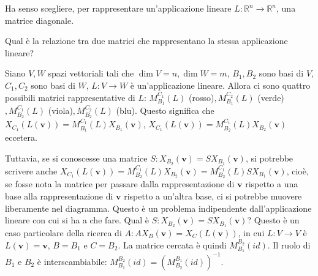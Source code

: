 \documentclass{article}
\begin{document}
Ha senso scegliere, per rappresentare un'applicazione lineare $L:%
\mathbb{R}
^{n}\rightarrow 
\mathbb{R}
^{n}$, una matrice diagonale.

Qual \`{e} la relazione tra due matrici che rappresentano la stessa
applicazione lineare?

Siano $V,W$ spazi vettoriali tali che $\dim V=n,\dim W=m$, $B_{1},B_{2}$
sono basi di $V$, $C_{1},C_{2}$ sono basi di $W$, $L:V\rightarrow W$ \`{e}
un'applicazione lineare. Allora ci sono quattro possibili matrici
rappresentative di $L$: $M_{B_{1}}^{C_{1}}\left( L\right) $ (rosso)$%
,M_{B_{1}}^{C_{2}}\left( L\right) $ (verde)$,M_{B_{2}}^{C_{1}}\left(
L\right) $ (viola)$,M_{B_{2}}^{C_{2}}\left( L\right) $ (blu). Questo
significa che $X_{C_{1}}\left( L\left( \mathbf{v}\right) \right)
=M_{B_{1}}^{C_{1}}\left( L\right) X_{B_{1}}\left( \mathbf{v}\right) $, $%
X_{C_{1}}\left( L\left( \mathbf{v}\right) \right) =M_{B_{2}}^{C_{1}}\left(
L\right) X_{B_{2}}\left( \mathbf{v}\right) $ eccetera.

Tuttavia, se si conoscesse una matrice $S:X_{B_{2}}\left( \mathbf{v}\right)
=SX_{B_{1}}\left( \mathbf{v}\right) $, si potrebbe scrivere anche $%
X_{C_{1}}\left( L\left( \mathbf{v}\right) \right) =M_{B_{2}}^{C_{1}}\left(
L\right) X_{B_{2}}\left( \mathbf{v}\right) =M_{B_{2}}^{C_{1}}\left( L\right)
SX_{B_{1}}\left( \mathbf{v}\right) $, cio\`{e}, se fosse nota la matrice per
passare dalla rappresentazione di $\mathbf{v}$ rispetto a una base alla
rappresentazione di $\mathbf{v}$ rispetto a un'altra base, ci si potrebbe
muovere liberamente nel diagramma. Questo \`{e} un problema indipendente
dall'applicazione lineare con cui si ha a che fare. Qual \`{e} $%
S:X_{B_{2}}\left( \mathbf{v}\right) =SX_{B_{1}}\left( \mathbf{v}\right) $?
Questo \`{e} un caso particolare della ricerca di $A:AX_{B}\left( \mathbf{v}%
\right) =X_{C}\left( L\left( \mathbf{v}\right) \right) $, in cui $%
L:V\rightarrow V$ \`{e} $L\left( \mathbf{v}\right) =\mathbf{v}$, $B=B_{1}$ e 
$C=B_{2}$. La matrice cercata \`{e} quindi $M_{B_{1}}^{B_{2}}\left(
id\right) $. Il ruolo di $B_{1}$ e $B_{2}$ \`{e} interscambiabile: $%
M_{B_{1}}^{B_{2}}\left( id\right) =\left( M_{B_{2}}^{B_{1}}\left( id\right)
\right) ^{-1}$.
\end{document}
